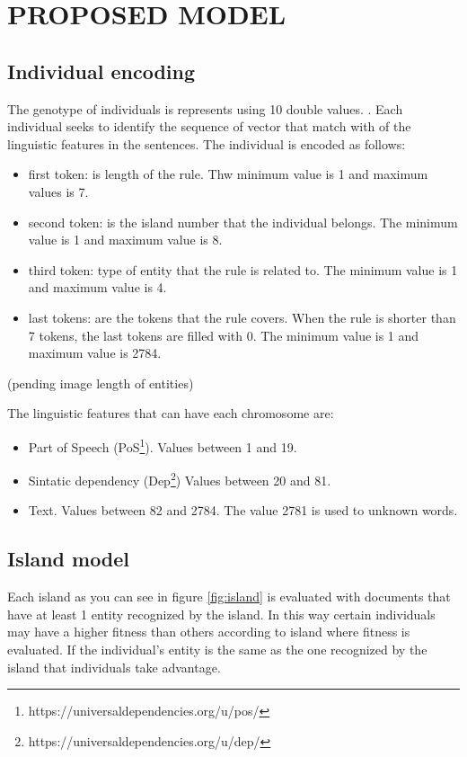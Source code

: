\documentclass{IEEEtran}
\begin{document}
\section{PROPOSED MODEL}


\subsection{Individual encoding}

The genotype of individuals is represents using 10 double values.
. Each individual seeks to identify the sequence of vector that match with of the linguistic features in the sentences. The individual is encoded as follows:
\begin{itemize}
  \item first token: is length of the rule. Thw minimum value is 1 and maximum values is 7.
  \item  second token: is the island number that the individual belongs. The minimum value is 1 and maximum value is 8.
  \item  third token: type of entity that the rule is related to. The minimum value is 1 and maximum value is 4.
  \item  last tokens: are the tokens that the rule covers. When the rule is shorter than 7 tokens, the last tokens are filled with 0. The minimum value is 1 and maximum value is 2784.
\end{itemize}

(pending image length of entities)

The linguistic features that can have each chromosome are:
\begin{itemize}
  \item Part of Speech (PoS\footnote{https://universaldependencies.org/u/pos/}). Values between 1 and 19.
  \item Sintatic dependency (Dep\footnote{https://universaldependencies.org/u/dep/}) Values between 20 and 81.
  \item Text. Values between 82 and 2784. The value 2781 is used to unknown words.
\end{itemize}

\subsection{Island model}

Each island as you can see in figure \ref{fig:island} is evaluated with documents that have at least 1 entity recognized by the island. In this way certain individuals may have a higher fitness than others according to island where fitness is evaluated. If the individual's entity is the same as the one recognized by the island that individuals take advantage.
\end{document}
